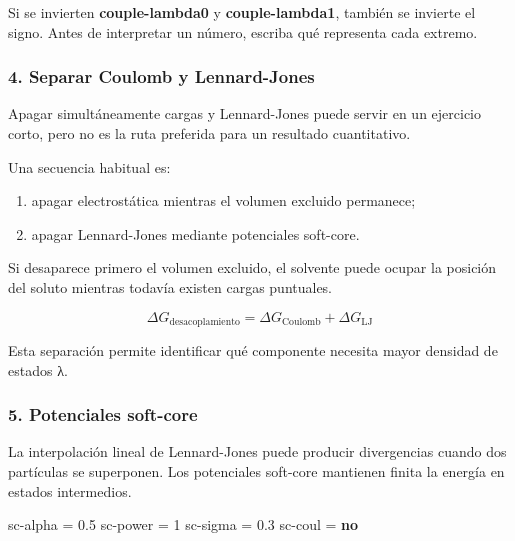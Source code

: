 \documentclass[
  spanish,
  11pt,
  a4paper]{article}
\newenvironment{Shaded}{\begin{snugshade}}{\end{snugshade}}
\newcommand{\DataTypeTok}[1]{\textcolor[rgb]{0.13,0.29,0.53}{#1}}
\newcommand{\DecValTok}[1]{\textcolor[rgb]{0.00,0.00,0.81}{#1}}
\newcommand{\FloatTok}[1]{\textcolor[rgb]{0.00,0.00,0.81}{#1}}
\newcommand{\KeywordTok}[1]{\textcolor[rgb]{0.13,0.29,0.53}{\textbf{#1}}}
\newcommand{\OtherTok}[1]{\textcolor[rgb]{0.56,0.35,0.01}{#1}}
\newcommand{\StringTok}[1]{\textcolor[rgb]{0.31,0.60,0.02}{#1}}
\providecommand{\tightlist}{%
  \setlength{\itemsep}{0pt}\setlength{\parskip}{0pt}}
\begin{document}
Si se invierten \textbf{couple-lambda0} y \textbf{couple-lambda1},
también se invierte el signo. Antes de interpretar un número, escriba
qué representa cada extremo.

\subsubsection{4. Separar Coulomb y
Lennard-Jones}\label{separar-coulomb-y-lennard-jones}

Apagar simultáneamente cargas y Lennard-Jones puede servir en un
ejercicio corto, pero no es la ruta preferida para un resultado
cuantitativo.

Una secuencia habitual es:

\begin{enumerate}
\def\labelenumi{\arabic{enumi}.}
\tightlist
\item
  apagar electrostática mientras el volumen excluido permanece;
\item
  apagar Lennard-Jones mediante potenciales soft-core.
\end{enumerate}

Si desaparece primero el volumen excluido, el solvente puede ocupar la
posición del soluto mientras todavía existen cargas puntuales.

\[
\Delta G_{\mathrm{desacoplamiento}}
=
\Delta G_{\mathrm{Coulomb}}
+
\Delta G_{\mathrm{LJ}}
\]

Esta separación permite identificar qué componente necesita mayor
densidad de estados λ.

\subsubsection{5. Potenciales soft-core}\label{potenciales-soft-core}

La interpolación lineal de Lennard-Jones puede producir divergencias
cuando dos partículas se superponen. Los potenciales soft-core mantienen
finita la energía en estados intermedios.

\begin{Shaded}
\begin{Highlighting}[]
\DataTypeTok{sc{-}alpha       }\OtherTok{=}\StringTok{ }\FloatTok{0.5}
\DataTypeTok{sc{-}power       }\OtherTok{=}\StringTok{ }\DecValTok{1}
\DataTypeTok{sc{-}sigma       }\OtherTok{=}\StringTok{ }\FloatTok{0.3}
\DataTypeTok{sc{-}coul        }\OtherTok{=}\StringTok{ }\KeywordTok{no}
\end{Highlighting}
\end{Shaded}
\end{document}
